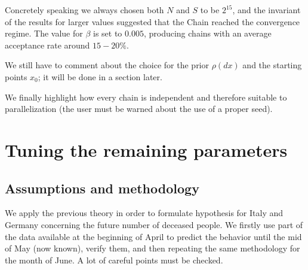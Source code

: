 \documentclass[8pt]{article}
\begin{document}
Concretely speaking we always chosen both $N$ and $S$ to be $2^{15}$,
and the invariant of the results for larger values suggested
that the Chain reached the convergence regime. The value for 
$\beta$ is set to $0.005$, producing chains with an average acceptance
rate around $15-20\%$.


We still have to comment about the choice for the prior $\rho(dx)$ and
the starting points $x_0$; it will be done in a section later.

We finally highlight how every chain 
is independent and therefore suitable to parallelization
(the user must be warned about the use of a proper seed).

\section{Tuning the remaining parameters}

\subsection{Assumptions and methodology}
We apply the previous theory in order to formulate hypothesis 
for Italy and Germany concerning the future number of
deceased people. We firstly use part of the data available at the beginning
of April to predict the behavior until the mid of May (now known),
verify them, and then
repeating the same methodology for the month of June.
A lot of careful points must be checked.
\end{document}
